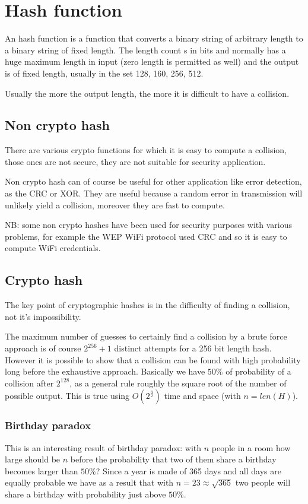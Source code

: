 \section{Hash function}
An hash function is a function that converts a binary string of arbitrary length to a binary string of fixed length.
The length count s in bits and normally has a huge maximum length in input (zero length is permitted as well) and the output is of fixed length, usually in the set 128, 160, 256, 512.

Usually the more the output length, the more it is difficult to have a collision.

\subsection{Non crypto hash}
There are various crypto functions for which it is easy to compute a collision, those ones are not secure, they are not suitable for security application.

Non crypto hash can of course be useful for other application like error detection, as the CRC or XOR.
They are useful because a random error in transmission will unlikely yield a collision, moreover they are fast to compute.

NB: some non crypto hashes have been used for security purposes with various problems, for example the WEP WiFi protocol used CRC and so it is easy to compute WiFi credentials.

\subsection{Crypto hash}
The key point of cryptographic hashes is in the difficulty of finding a collision, not it's impossibility.

The maximum number of guesses to certainly find a collision by a brute force approach is of course $2^{256}+1$ distinct attempts for a 256 bit length hash.
However it is possible to show that a collision can be found with high probability long before the exhaustive approach.
Basically we have $50\%$ of probability of a collision after $2^{128}$, as a general rule roughly the square root of the number of possible output.
This is true using $O(2^{\frac{n}{2}})$ time and space (with $n = len(H)$).

\subsubsection{Birthday paradox}
This is an interesting result of birthday paradox: with $n$ people in a room how large should be $n$ before the probability that two of them share a birthday becomes larger than $50\%$?
Since a year is made of 365 days and all days are equally probable we have as a result that with $n = 23 \approx \sqrt{365}$ two people will share a birthday with probability just above $50\%$.

